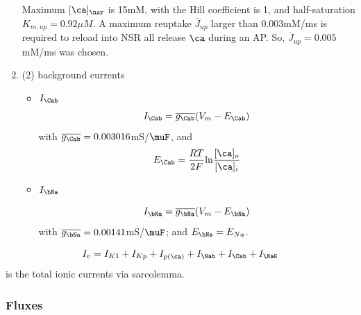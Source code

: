 \begin{enumerate}
Maximum $[\ca]_\nsr$ is 15mM, with the Hill coefficient is 1, and
half-saturation $K_{m,up}=0.92\mu M$. A maximum reuptake
$\overline{J}_{up}$ larger than 0.003mM/ms is required to reload into NSR
all release $\ca$ during an AP. So, $\overline{J}_{up}=0.005$ mM/ms was
chosen. 

\item (2) background currents
  \begin{itemize}
  \item $I_\Cab$
    \begin{equation}
      \label{eq:773}
      I_\Cab = \overline{g_\Cab}(V_m-E_\Cab)
    \end{equation}
    with $\overline{g_\Cab} = 0.003016$mS/$\muF$, and
    \begin{equation}
      \label{eq:774}
      E_\Cab = \frac{RT}{2F} \ln \frac{[\ca]_o}{[\ca]_i}
    \end{equation}
  \item $I_\bNa$

    \begin{equation}
      \label{eq:775}
      I_\bNa = \overline{g_\bNa} (V_m-E_\bNa)
    \end{equation}
    with $\overline{g_\bNa} = 0.00141$mS/$\muF$; and $E_\bNa=E_{Na}$. 
  \end{itemize}
\end{enumerate}

\begin{framed}
  \begin{equation}
    \label{eq:1262}
    I_v = I_{K1} + I_{Kp} + I_{p(\ca)} + I_\Nab + I_\Cab + I_\NaK
  \end{equation}
is the total ionic currents via sarcolemma. 
\end{framed}

\subsubsection{Fluxes}
\label{sec:fluxes-8}

